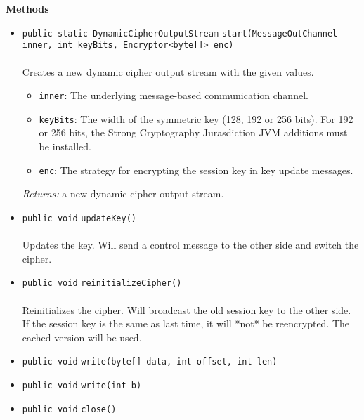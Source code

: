 \textbf{\sffamily Methods}
\begin{itemize}
\item \lstinline|public static DynamicCipherOutputStream| \lstinline|start|\lstinline|(MessageOutChannel inner, int keyBits, Encryptor<byte[]> enc)|\\ \\[-0.6em]
Creates a new dynamic cipher output stream with the given values.
\begin{itemize}
\item \lstinline|inner|: The underlying message-based communication channel.
\item \lstinline|keyBits|: The width of the symmetric key (128, 192 or 256 bits).
 For 192 or 256 bits, the Strong Cryptography Jurasdiction JVM additions
 must be installed.
\item \lstinline|enc|: The strategy for encrypting the session key in key update
 messages.
\end{itemize}

\emph{Returns:} a new dynamic cipher output stream.

\item \lstinline|public void| \lstinline|updateKey|\lstinline|()|\\ \\[-0.6em]
Updates the key. Will send a control message to the other side and
 switch the cipher.



\item \lstinline|public void| \lstinline|reinitializeCipher|\lstinline|()|\\ \\[-0.6em]
Reinitializes the cipher. Will broadcast the old session key to the other
 side. If the session key is the same as last time, it will *not* be
 reencrypted. The cached version will be used.



\item \lstinline|public void| \lstinline|write|\lstinline|(byte[] data, int offset, int len)| \\[-0.6em]




\item \lstinline|public void| \lstinline|write|\lstinline|(int b)| \\[-0.6em]




\item \lstinline|public void| \lstinline|close|\lstinline|()| \\[-0.6em]





\end{itemize}

